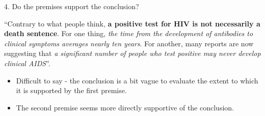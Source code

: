 \documentclass{beamer}
\begin{document}
\begin{frame}{4. Do the premises support the conclusion?}

	``Contrary to what people think, \textbf{a positive test for HIV is not necessarily a death sentence}. For one thing, \emph{the time from the development of antibodies to clinical symptoms averages nearly ten years}. For another, many reports are now suggesting that \emph{a significant number of people who test positive may never develop clinical AIDS}''.

\begin{itemize}
\item Difficult to say - the conclusion is a bit vague to evaluate the extent to which it is supported by the first premise.
\item The second premise seems more directly supportive of the conclusion.
\end{itemize}
\end{frame}



\end{document}
